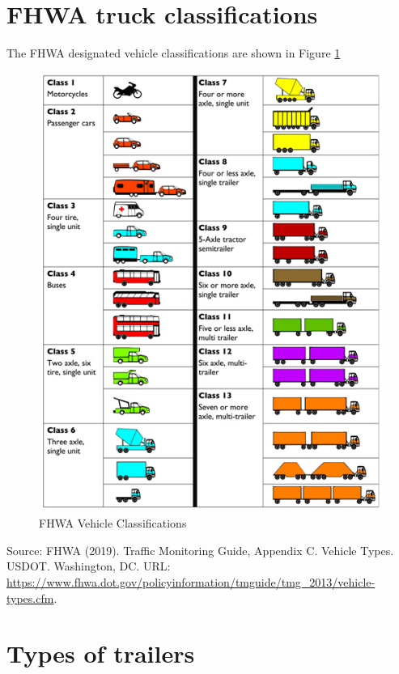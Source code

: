 \documentclass[
]{book}
\begin{document}
\hypertarget{VehChars-Classes}{%
\section{FHWA truck classifications}\label{VehChars-Classes}}

The FHWA designated vehicle classifications are shown in Figure \ref{fig:VehClassesImage}

\begin{figure}

{\centering \includegraphics{./Images/VehClassesFHWA} 

}

\caption{FHWA Vehicle Classifications}\label{fig:VehClassesImage}
\end{figure}

Source: FHWA (2019). Traffic Monitoring Guide, Appendix C. Vehicle Types. USDOT. Washington, DC. URL: \url{https://www.fhwa.dot.gov/policyinformation/tmguide/tmg_2013/vehicle-types.cfm}.

\hypertarget{types-of-trailers}{%
\section{Types of trailers}\label{types-of-trailers}}
\end{document}
